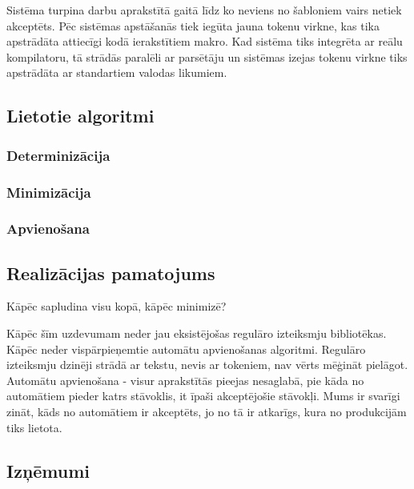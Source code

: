 Sistēma turpina darbu aprakstītā gaitā līdz ko neviens no šabloniem vairs netiek akceptēts. Pēc sistēmas apstāšanās tiek iegūta jauna tokenu virkne, kas tika apstrādāta attiecīgi kodā ierakstītiem makro. Kad sistēma tiks integrēta ar reālu kompilatoru, tā strādās paralēli ar parsētāju un sistēmas izejas tokenu virkne tiks apstrādāta ar standartiem valodas likumiem.

\subsection{Lietotie algoritmi}
\label{subsec:solution_algorithms}

\subsubsection{Determinizācija}

\subsubsection{Minimizācija}

\subsubsection{Apvienošana}

\subsection{\label{subsec:solution_motivation}Realizācijas pamatojums}

Kāpēc sapludina visu kopā, kāpēc minimizē?

Kāpēc šīm uzdevumam neder jau eksistējošas regulāro izteiksmju bibliotēkas. Kāpēc  neder vispārpieņemtie automātu apvienošanas algoritmi.
Regulāro izteiksmju dzinēji strādā ar tekstu, nevis ar tokeniem, nav vērts mēģināt pielāgot. Automātu apvienošana - visur aprakstītās pieejas nesaglabā, pie kāda no automātiem pieder katrs stāvoklis, it īpaši akceptējošie stāvokļi. Mums ir svarīgi zināt, kāds no automātiem ir akceptēts, jo no tā ir atkarīgs, kura no produkcijām tiks lietota. 

\subsection{\label{subsec:solution_problems}Izņēmumi}


